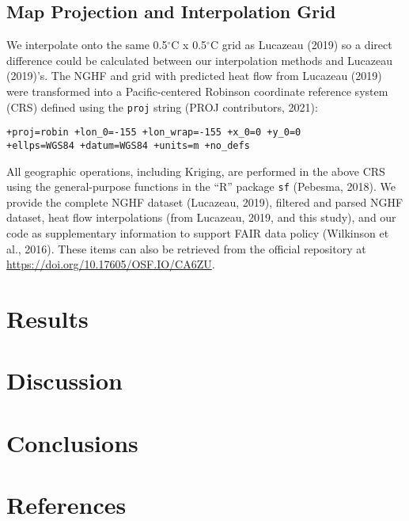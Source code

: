 \documentclass[draft,linenumbers]{agujournal2018}
\begin{document}
\subsection{Map Projection and Interpolation Grid}

We interpolate onto the same 0.5\(^{\circ}\)C x 0.5\(^{\circ}\)C grid as
Lucazeau (2019) so a direct difference could be calculated between our
interpolation methods and Lucazeau (2019)'s. The NGHF and grid with
predicted heat flow from Lucazeau (2019) were transformed into a
Pacific-centered Robinson coordinate reference system (CRS) defined
using the \texttt{proj} string (PROJ contributors, 2021):

\begin{verbatim}
+proj=robin +lon_0=-155 +lon_wrap=-155 +x_0=0 +y_0=0
+ellps=WGS84 +datum=WGS84 +units=m +no_defs
\end{verbatim}

All geographic operations, including Kriging, are performed in the above
CRS using the general-purpose functions in the ``R'' package \texttt{sf}
(Pebesma, 2018). We provide the complete NGHF dataset (Lucazeau, 2019),
filtered and parsed NGHF dataset, heat flow interpolations (from
Lucazeau, 2019, and this study), and our code as supplementary
information to support FAIR data policy (Wilkinson et al., 2016). These
items can also be retrieved from the official repository at
\url{https://doi.org/10.17605/OSF.IO/CA6ZU}.

\section{Results}

\section{Discussion}

\section{Conclusions}

\acknowledgments

\clearpage

\section*{References}
\end{document}
